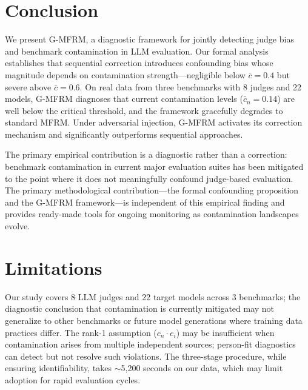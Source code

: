 \documentclass[11pt]{article}
\begin{document}
\section{Conclusion}
\label{sec:conclusion}

We present G-MFRM, a diagnostic framework for jointly detecting judge bias and benchmark contamination in LLM evaluation. Our formal analysis establishes that sequential correction introduces confounding bias whose magnitude depends on contamination strength---negligible below $\bar{c} = 0.4$ but severe above $\bar{c} = 0.6$. On real data from three benchmarks with 8 judges and 22 models, G-MFRM diagnoses that current contamination levels ($\bar{c}_n = 0.14$) are well below the critical threshold, and the framework gracefully degrades to standard MFRM. Under adversarial injection, G-MFRM activates its correction mechanism and significantly outperforms sequential approaches.

The primary empirical contribution is a diagnostic rather than a correction: benchmark contamination in current major evaluation suites has been mitigated to the point where it does not meaningfully confound judge-based evaluation. The primary methodological contribution---the formal confounding proposition and the G-MFRM framework---is independent of this empirical finding and provides ready-made tools for ongoing monitoring as contamination landscapes evolve.

\section*{Limitations}

Our study covers 8 LLM judges and 22 target models across 3 benchmarks; the diagnostic conclusion that contamination is currently mitigated may not generalize to other benchmarks or future model generations where training data practices differ.
The rank-1 assumption ($c_n \cdot e_i$) may be insufficient when contamination arises from multiple independent sources; person-fit diagnostics can detect but not resolve such violations.
The three-stage procedure, while ensuring identifiability, takes $\sim$5,200 seconds on our data, which may limit adoption for rapid evaluation cycles.



\end{document}
